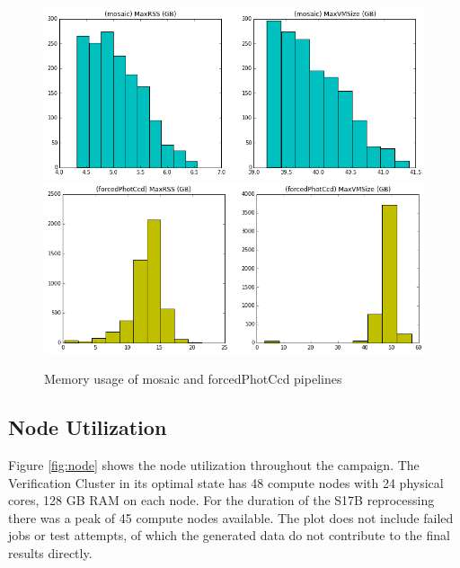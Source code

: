 \documentclass[DM,authoryear,toc]{lsstdoc}
\begin{document}
\begin{enumerate}
\begin{figure}[htbp]
        \begin{center}
                 \includegraphics[width=\textwidth]{figures/maxm_mosaic}
                 \includegraphics[width=\textwidth]{figures/maxm_forcPhotCcd}
                 \caption{Memory usage of mosaic and forcedPhotCcd pipelines}
                 \label{fig:maxm}
        \end{center}
\end{figure}

\end{enumerate}

\subsection{Node Utilization}

Figure \ref{fig:node} shows the node utilization throughout the campaign.
The Verification Cluster in its optimal state has 48 compute nodes with 24 physical cores, 128 GB RAM on each node.  For the duration of the S17B reprocessing there was a peak of 45 compute nodes available. The plot does not include failed jobs or test attempts, of which the generated data do not contribute to the final results directly.
\end{document}
